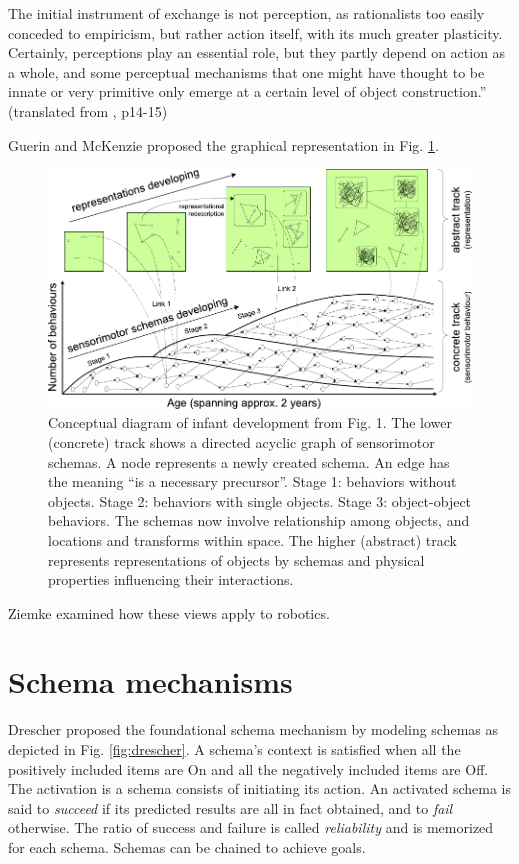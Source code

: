 \documentclass[runningheads]{llncs}
\begin{document}
The initial instrument of exchange is not perception, as rationalists too easily conceded to empiricism, but rather action itself, with its much greater plasticity. 
Certainly, perceptions play an essential role, but they partly depend on action as a whole, and some perceptual mechanisms that one might have thought to be innate or very primitive only emerge at a certain level of object construction.'' (translated from \cite{piaget_lepistemologie_2011}, p14-15)


Guerin and McKenzie \cite{guerin_survey_2013} proposed the graphical representation in Fig. \ref{fig:general}.

\begin{figure}
	\includegraphics[width=\textwidth]{Figure_1_guerin.pdf}
	\caption{Conceptual diagram of infant development from \cite{guerin_survey_2013} Fig. 1.
	The lower (concrete) track shows a directed acyclic graph of sensorimotor schemas. 
	A node represents a newly created schema. 
	An edge has the meaning ``is a necessary precursor''. 
    Stage 1: behaviors without objects. 
    Stage 2: behaviors with single objects. 
    Stage 3: object-object behaviors. The schemas now involve relationship among objects, and locations and transforms within space.
    The higher (abstract) track represents representations of objects by schemas and physical properties influencing their interactions.} 
	\label{fig:general}
\end{figure}

Ziemke \cite{ziemke_construction_2001} examined how these views apply to robotics.


\section{Schema mechanisms}

Drescher \cite{drescher_made-up_1991} proposed the foundational schema mechanism by modeling schemas as depicted in Fig. \ref{fig:drescher}. 
A schema's context is satisfied when all the positively included items are On and all the negatively included items are Off. 
The activation is a schema consists of initiating its action. An activated schema is said to \textit{succeed} if its predicted results are all in fact obtained, and to \textit{fail} otherwise. The ratio of success and failure is called \textit{reliability} and is memorized for each schema.  
Schemas can be chained to achieve goals. 
\end{document}

